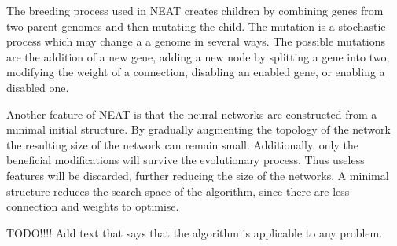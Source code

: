 The breeding process used in NEAT creates children by combining genes from two parent genomes and then mutating the child. The mutation is a stochastic process which may change a a genome in several ways. The possible mutations are the addition of a new gene, adding a new node by splitting a gene into two, modifying the weight of a connection, disabling an enabled gene, or enabling a disabled one.

Another feature of NEAT is that the neural networks are constructed from a minimal initial structure. By gradually augmenting the topology of the network the resulting size of the network can remain small. Additionally, only the beneficial modifications will survive the evolutionary process. Thus useless features will be discarded, further reducing the size of the networks. A minimal structure reduces the search space of the algorithm, since there are less connection and weights to optimise. 

TODO!!!! Add text that says that the algorithm is applicable to any problem.



